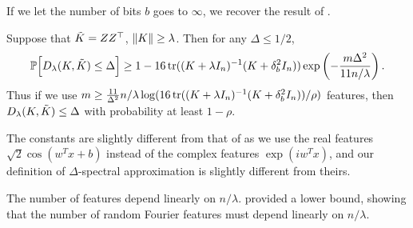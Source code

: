 If we let the number of bits $b$ goes to $\infty$, we recover the
result of \citet{avron17}.
\begin{corollary}
  Suppose that $\tilde{K} = ZZ^\top$, $\|K\| \geq \lambda$.
Then for any $\Delta \leq 1/2$,
\begin{equation*}
\mathbb{P}\Big[D_{\lambda}(K,\tilde{K}) \leq \Delta\Big] \geq 1 - 16 \mathop{\rm tr}((K +
\lambda I_n)^{-1} (K + \delta^2_b I_n)) \exp \left( -\frac{m \Delta^2}{11n/\lambda} \right).
\end{equation*}
Thus if we use $m \geq \frac{11}{\Delta^2} n/\lambda \log (16 \mathop{\rm tr}((K + \lambda I_n)^{-1} (K + \delta^2_b I_n)) / \rho)$
features, then $D_\lambda(K,\tilde{K})\leq \Delta$  with probability at least $1 - \rho$.
\end{corollary}
The constants are slightly different from that of \citet{avron17} as we use the
real features $\sqrt{2} \cos(w^T x + b)$ instead of the complex features $\exp(i
w^T x)$, and our definition of $\Delta$-spectral approximation is slightly different
from theirs.

The number of features depend linearly on $n/ \lambda$.
\citet{avron17} provided a lower bound, showing that the number of random Fourier features
must depend linearly on $n / \lambda$.

